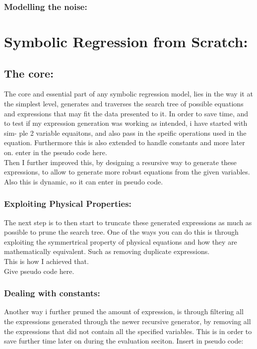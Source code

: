 \documentclass{article}
\begin{document}
\subsubsection{Modelling the noise: }

\section{Symbolic Regression from Scratch: }
\subsection{The core: }
The core and essential part of any symbolic regression model, lies in the way it at the simplest level, generates
and traverses the search tree of possible equations and expressions that may fit the data presented to it.
In order to save time, and to test if my expression generation was working as intended, i have started with sim-
ple 2 variable equaitons, and also pass in the speific operations used in the equation. Furthermore this is also
extended to handle constants and more later on.
enter in the pseudo code here.\\

Then I further improved this, by designing a resursive way to generate these expressions, to allow to generate
more robust equations from the given variables. Also this is dynamic, so it can
enter in pseudo code.\\

\subsubsection{ Exploiting Physical Properties: }

The next step is to then start to truncate these generated expressions as much as possible to prune the search
tree. One of the ways you can do this is through exploiting the symmertrical property of physical equations and
how they are mathematically equivalent. Such as removing duplicate expressions.\\
This is how I achieved that.\\
Give pseudo code here.\\

\subsubsection{Dealing with constants:}

Another way i further pruned the amount of expression, is through filtering all the expressions generated through
the newer recursive generator, by removing all the expressions that did not contain all the specified variables.
This is in order to save further time later on during the evaluation seciton.
Insert in pseudo code:
\end{document}
